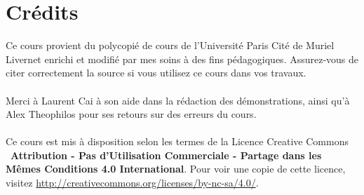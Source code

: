 \documentclass{article}
\begin{document}
\newpage
\tableofcontents 
\section*{Crédits}
Ce cours provient du polycopié de cours de l'Université Paris Cité de Muriel Livernet enrichi et modifié par mes soins à des fins pédagogiques. Assurez-vous de citer correctement la source si vous utilisez ce cours dans vos travaux.\\\\
Merci à Laurent Cai à son aide dans la rédaction des démonstrations, ainsi qu'à Alex Theophilos pour ses retours sur des erreurs du cours.\\\\
Ce cours est mis à disposition selon les termes de la Licence Creative Commons \ccbyncsa\ \textbf{Attribution - Pas d'Utilisation Commerciale - Partage dans les Mêmes Conditions 4.0 International}. 
Pour voir une copie de cette licence, visitez \url{http://creativecommons.org/licenses/by-nc-sa/4.0/}.
\end{document}
